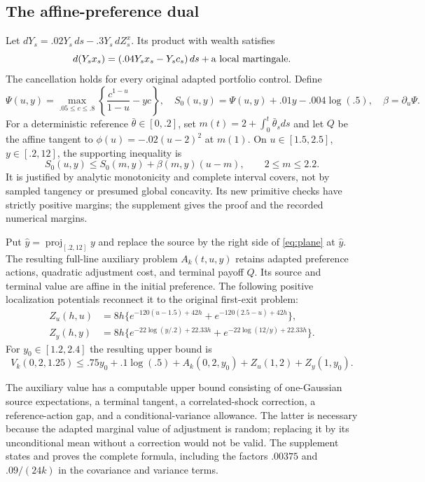 \subsection{The affine-preference dual}
Let $dY_s=.02Y_s\,ds-.3Y_s\,dZ^x_s$. Its product with wealth satisfies
\[
 d(Y_sx_s)=(.04Y_sx_s-Y_sc_s)\,ds+\hbox{a local martingale}.
\]
The cancellation holds for every original adapted portfolio control. Define
\[
 \Psi(u,y)=\max_{.05\leq c\leq.8}\left\{\frac{c^{1-u}}{1-u}-yc\right\},\quad
 S_0(u,y)=\Psi(u,y)+.01y-.004\log(.5),\quad\beta=\partial_u\Psi.
\]
For a deterministic reference $\bar\theta\in[0,.2]$, set $m(t)=2+\int_0^t\bar\theta_sds$ and let $Q$ be the affine tangent to $\phi(u)=-.02(u-2)^2$ at $m(1)$. On $u\in[1.5,2.5]$, $y\in[.2,12]$, the supporting inequality is
\begin{equation}
 S_0(u,y)\leq S_0(m,y)+\beta(m,y)(u-m),\qquad 2\leq m\leq2.2.
 \label{eq:plane}
\end{equation}
It is justified by analytic monotonicity and complete interval covers, not by sampled tangency or presumed global concavity. Its new primitive checks have strictly positive margins; the supplement gives the proof and the recorded numerical margins.

Put $\widehat y=\operatorname{proj}_{[.2,12]}y$ and replace the source by the right side of \eqref{eq:plane} at $\widehat y$. The resulting full-line auxiliary problem $A_k(t,u,y)$ retains adapted preference actions, quadratic adjustment cost, and terminal payoff $Q$. Its source and terminal value are affine in the initial preference. The following positive localization potentials reconnect it to the original first-exit problem:
\begin{align}
 Z_u(h,u)&=8h\{e^{-120(u-1.5)+42h}+e^{-120(2.5-u)+42h}\},\label{eq:Zu}\\
 Z_y(h,y)&=8h\{e^{-22\log(y/.2)+22.33h}+e^{-22\log(12/y)+22.33h}\}.
 \label{eq:Zy}
\end{align}
For $y_0\in[1.2,2.4]$ the resulting upper bound is
\begin{equation}
 V_k(0,2,1.25)\leq .75y_0+.1\log(.5)+A_k(0,2,y_0)+Z_u(1,2)+Z_y(1,y_0).
 \label{eq:dual}
\end{equation}

The auxiliary value has a computable upper bound consisting of one-Gaussian source expectations, a terminal tangent, a correlated-shock correction, a reference-action gap, and a conditional-variance allowance. The latter is necessary because the adapted marginal value of adjustment is random; replacing it by its unconditional mean without a correction would not be valid. The supplement states and proves the complete formula, including the factors $.00375$ and $.09/(24k)$ in the covariance and variance terms.

